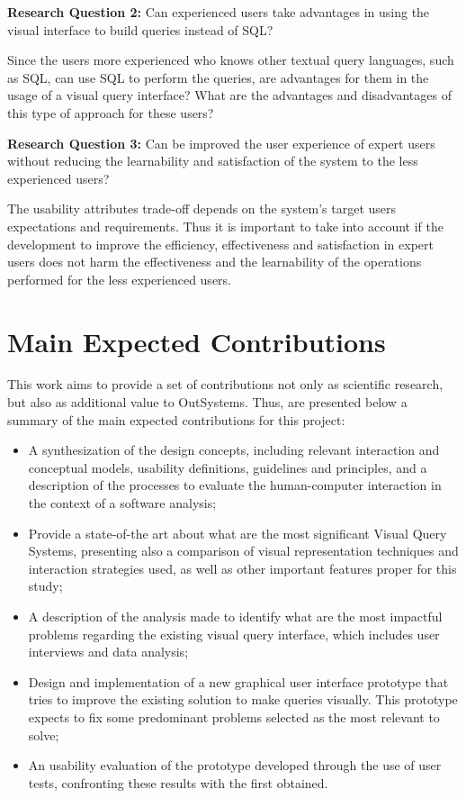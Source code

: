 \medskip

\textbf{Research Question 2:} Can experienced users take advantages in using the visual interface to build queries instead of SQL?

\medskip

Since the users more experienced who knows other textual query languages, such as SQL, can use SQL to perform the queries, are advantages for them in the usage of a visual query interface? What are the advantages and disadvantages of this type of approach for these users?

\medskip

\textbf{Research Question 3:} Can be improved the user experience of expert users without reducing the learnability and satisfaction of the system to the less experienced users?

\medskip

The usability attributes trade-off depends on the system's target users expectations and requirements. Thus it is important to take into account if the development to improve the efficiency, effectiveness and satisfaction in expert users does not harm the effectiveness and the learnability of the operations performed for the less experienced users.

\section{Main Expected Contributions}
\label{sec:main_exp_contributions}
This work aims to provide a set of contributions not only as scientific research, but also as additional value to OutSystems. Thus, are presented below a summary of the main expected contributions for this project:

\begin{itemize}
  \item A synthesization of the design concepts, including relevant interaction and conceptual models, usability definitions, guidelines and principles, and a description of the processes to evaluate the human-computer interaction in the context of a software analysis;
  \item Provide a state-of-the art about what are the most significant Visual Query Systems, presenting also a comparison of visual representation techniques and interaction strategies used, as well as other important features proper for this study;
  \item A description of the analysis made to identify what are the most impactful problems regarding the existing visual query interface, which includes user interviews and data analysis;
  \item Design and implementation of a new graphical user interface prototype that tries to improve the existing solution to make queries visually. This prototype expects to fix some predominant problems selected as the most relevant to solve;
  \item An usability evaluation of the prototype developed through the use of user tests, confronting these results with the first obtained.
\end{itemize} 

